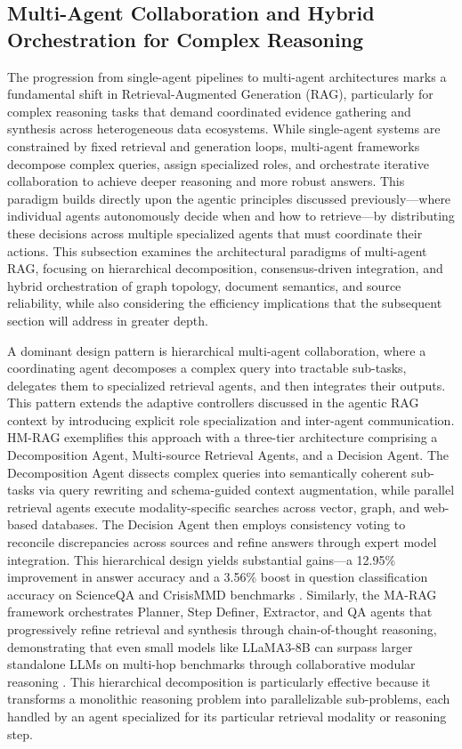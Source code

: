 \documentclass[11pt]{article}
\begin{document}
\subsection{Multi-Agent Collaboration and Hybrid Orchestration for Complex Reasoning}

The progression from single-agent pipelines to multi-agent architectures marks a fundamental shift in Retrieval-Augmented Generation (RAG), particularly for complex reasoning tasks that demand coordinated evidence gathering and synthesis across heterogeneous data ecosystems. While single-agent systems are constrained by fixed retrieval and generation loops, multi-agent frameworks decompose complex queries, assign specialized roles, and orchestrate iterative collaboration to achieve deeper reasoning and more robust answers. This paradigm builds directly upon the agentic principles discussed previously---where individual agents autonomously decide when and how to retrieve---by distributing these decisions across multiple specialized agents that must coordinate their actions. This subsection examines the architectural paradigms of multi-agent RAG, focusing on hierarchical decomposition, consensus-driven integration, and hybrid orchestration of graph topology, document semantics, and source reliability, while also considering the efficiency implications that the subsequent section will address in greater depth.

A dominant design pattern is hierarchical multi-agent collaboration, where a coordinating agent decomposes a complex query into tractable sub-tasks, delegates them to specialized retrieval agents, and then integrates their outputs. This pattern extends the adaptive controllers discussed in the agentic RAG context by introducing explicit role specialization and inter-agent communication. HM-RAG exemplifies this approach with a three-tier architecture comprising a Decomposition Agent, Multi-source Retrieval Agents, and a Decision Agent. The Decomposition Agent dissects complex queries into semantically coherent sub-tasks via query rewriting and schema-guided context augmentation, while parallel retrieval agents execute modality-specific searches across vector, graph, and web-based databases. The Decision Agent then employs consistency voting to reconcile discrepancies across sources and refine answers through expert model integration. This hierarchical design yields substantial gains---a 12.95\% improvement in answer accuracy and a 3.56\% boost in question classification accuracy on ScienceQA and CrisisMMD benchmarks \cite{ref320}. Similarly, the MA-RAG framework orchestrates Planner, Step Definer, Extractor, and QA agents that progressively refine retrieval and synthesis through chain-of-thought reasoning, demonstrating that even small models like LLaMA3-8B can surpass larger standalone LLMs on multi-hop benchmarks through collaborative modular reasoning \cite{ref321}. This hierarchical decomposition is particularly effective because it transforms a monolithic reasoning problem into parallelizable sub-problems, each handled by an agent specialized for its particular retrieval modality or reasoning step.
\end{document}
